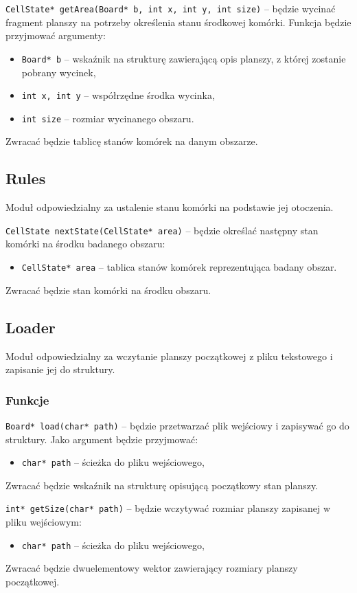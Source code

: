 \documentclass{article}
\begin{document}
\noindent{}\texttt{CellState* getArea(Board* b, int x, int y, int size)} -- będzie wycinać fragment planszy na potrzeby określenia stanu środkowej komórki. Funkcja będzie przyjmować argumenty:
\begin{itemize}[label={}]
	\item \texttt{Board* b} -- wskaźnik na strukturę zawierającą opis planszy, z której zostanie pobrany wycinek,
	\item \texttt{int x, int y} -- współrzędne środka wycinka,
	\item \texttt{int size} -- rozmiar wycinanego obszaru.
\end{itemize}
Zwracać będzie tablicę stanów komórek na danym obszarze.

\subsection{Rules}
Moduł odpowiedzialny za ustalenie stanu komórki na podstawie jej otoczenia.

\noindent{}\texttt{CellState nextState(CellState* area)} -- będzie określać następny stan komórki na środku badanego obszaru:
\begin{itemize}[label={}]
	\item \texttt{CellState* area} -- tablica stanów komórek reprezentująca badany obszar.
\end{itemize}
Zwracać będzie stan komórki na środku obszaru.


\subsection{Loader}
Moduł odpowiedzialny za wczytanie planszy początkowej z pliku tekstowego i zapisanie jej do struktury.

\subsubsection{Funkcje}
\texttt{Board* load(char* path)} -- będzie przetwarzać plik wejściowy i zapisywać go do struktury. Jako argument będzie przyjmować:
\begin{itemize}[label={}]
	\item \texttt{char* path} -- ścieżka do pliku wejściowego,
\end{itemize}
Zwracać będzie wskaźnik na strukturę opisującą początkowy stan planszy.
\vspace{5mm}

\noindent{}\texttt{int* getSize(char* path)} -- będzie wczytywać rozmiar planszy zapisanej w pliku wejściowym:
\begin{itemize}[label={}]
	\item \texttt{char* path} -- ścieżka do pliku wejściowego,
\end{itemize}
Zwracać będzie dwuelementowy wektor zawierający rozmiary planszy początkowej.
\end{document}
